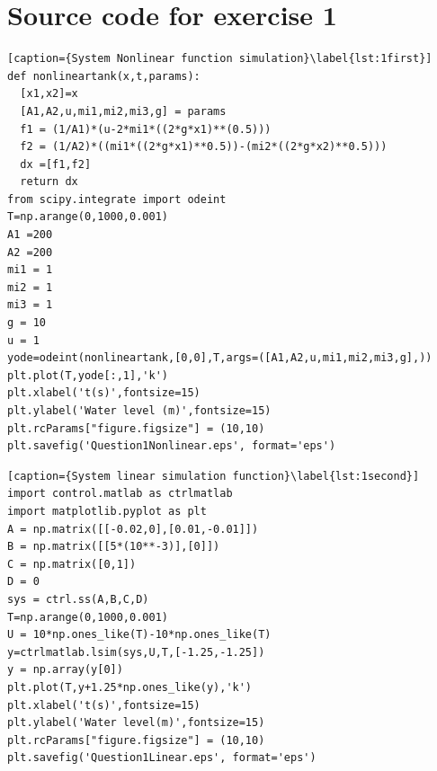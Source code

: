\documentclass[a4paper,11pt]{article}
\begin{document}
\section{Source code for exercise 1}
\begin{lstlisting}[caption={System Nonlinear function simulation}\label{lst:1first}]
def nonlineartank(x,t,params):
  [x1,x2]=x
  [A1,A2,u,mi1,mi2,mi3,g] = params
  f1 = (1/A1)*(u-2*mi1*((2*g*x1)**(0.5)))
  f2 = (1/A2)*((mi1*((2*g*x1)**0.5))-(mi2*((2*g*x2)**0.5)))
  dx =[f1,f2]
  return dx
from scipy.integrate import odeint
T=np.arange(0,1000,0.001)
A1 =200
A2 =200
mi1 = 1
mi2 = 1
mi3 = 1
g = 10
u = 1
yode=odeint(nonlineartank,[0,0],T,args=([A1,A2,u,mi1,mi2,mi3,g],))
plt.plot(T,yode[:,1],'k')
plt.xlabel('t(s)',fontsize=15)
plt.ylabel('Water level (m)',fontsize=15)
plt.rcParams["figure.figsize"] = (10,10)
plt.savefig('Question1Nonlinear.eps', format='eps')
\end{lstlisting}
\begin{lstlisting}[caption={System linear simulation function}\label{lst:1second}]
import control.matlab as ctrlmatlab
import matplotlib.pyplot as plt
A = np.matrix([[-0.02,0],[0.01,-0.01]])
B = np.matrix([[5*(10**-3)],[0]])
C = np.matrix([0,1])
D = 0
sys = ctrl.ss(A,B,C,D)
T=np.arange(0,1000,0.001)
U = 10*np.ones_like(T)-10*np.ones_like(T)
y=ctrlmatlab.lsim(sys,U,T,[-1.25,-1.25])
y = np.array(y[0])
plt.plot(T,y+1.25*np.ones_like(y),'k')
plt.xlabel('t(s)',fontsize=15)
plt.ylabel('Water level(m)',fontsize=15)
plt.rcParams["figure.figsize"] = (10,10)
plt.savefig('Question1Linear.eps', format='eps')
\end{lstlisting}
\end{document}
